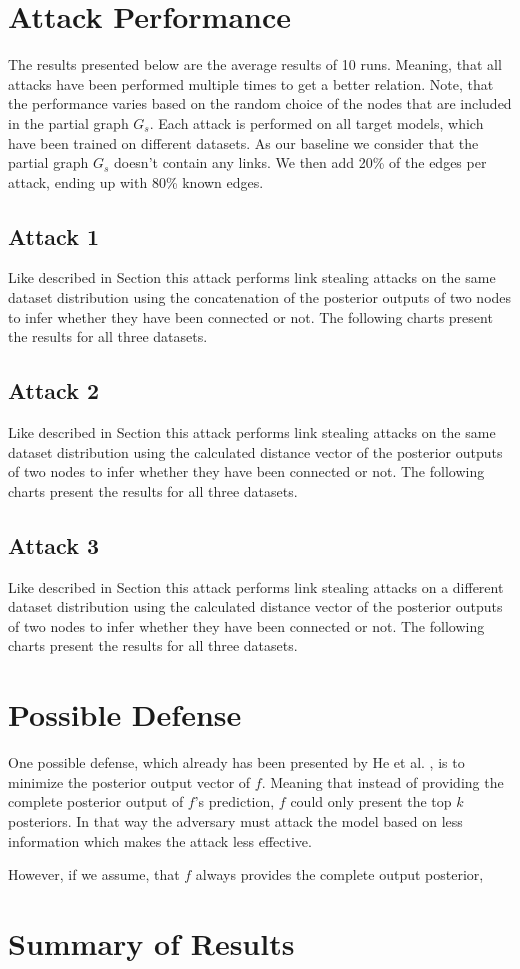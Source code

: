     \section{Attack Performance}
        The results presented below are the average results of 10 runs.
        Meaning, that all attacks have been performed multiple times to get a better relation.
        Note, that the performance varies based on the random choice of the nodes that are included in the partial graph $G_s$.
        Each attack is performed on all target models, which have been trained on different datasets.
        As our baseline we consider that the partial graph $G_s$ doesn't contain any links.
        We then add 20\% of the edges per attack, ending up with 80\% known edges.

        \subsection*{Attack 1}
            Like described in Section  this attack performs link stealing attacks on the same dataset distribution using the concatenation of the posterior outputs of two nodes to infer whether they have been connected or not. 
            The following charts present the results for all three datasets.

        \subsection*{Attack 2}
            Like described in Section  this attack performs link stealing attacks on the same dataset distribution using the calculated distance vector of the posterior outputs of two nodes to infer whether they have been connected or not. 
            The following charts present the results for all three datasets.

        \subsection*{Attack 3}
            Like described in Section  this attack performs link stealing attacks on a different dataset distribution using the calculated distance vector of the posterior outputs of two nodes to infer whether they have been connected or not. 
            The following charts present the results for all three datasets.
    
    \section{Possible Defense}
        One possible defense, which already has been presented by He et al. \cite{DBLP:journals/corr/abs-2005-02131}, is to minimize the posterior output vector of $f$. 
        Meaning that instead of providing the complete posterior output of $f$'s prediction, $f$ could only present the top $k$ posteriors.
        In that way the adversary must attack the model based on less information which makes the attack less effective.
        
        However, if we assume, that $f$ always provides the complete output posterior, 

    \section{Summary of Results}
